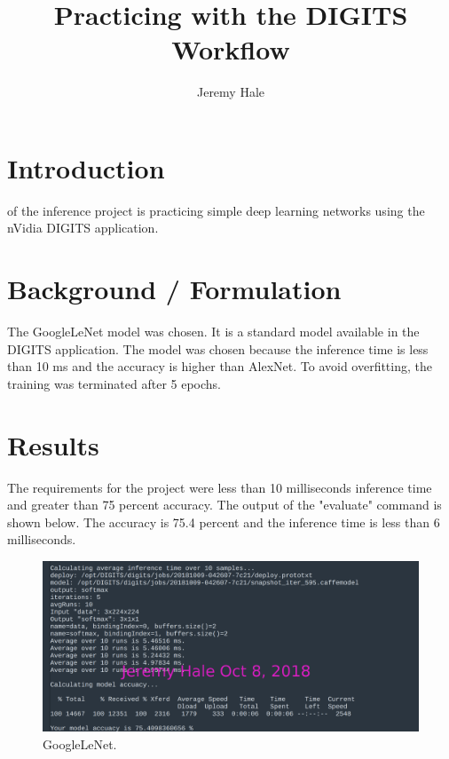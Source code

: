 \documentclass[10pt,journal,compsoc]{IEEEtran}
\begin{document}
\title{Practicing with the DIGITS Workflow}

\author{Jeremy Hale}

%
{}


\maketitle
\IEEEdisplaynontitleabstractindextext
\IEEEpeerreviewmaketitle
\section{Introduction}
\label{sec:introduction}

 of the inference project is practicing simple deep learning networks using the nVidia DIGITS application.

\section{Background / Formulation}
The GoogleLeNet model was chosen. It is a standard model available in the DIGITS application. The model was chosen because the inference time is less than 10 ms and the accuracy is higher than AlexNet. To avoid overfitting, the training was terminated after 5 epochs.

\section{Results}
The requirements for the project were less than 10 milliseconds inference time and greater than 75 percent accuracy. The output of the "evaluate" command is shown below. The accuracy is 75.4 percent and the inference time is less than 6 milliseconds.

\begin{figure}[thpb]
      \centering
      \includegraphics[width=\linewidth]{googlenet_epoch5_water}
      \caption{GoogleLeNet.}
      \label{fig:GoogleLeNet}
\end{figure}
\end{document}
